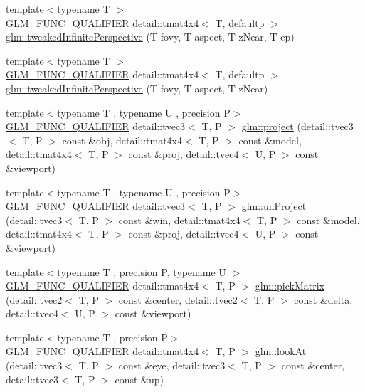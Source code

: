 \begin{DoxyCompactItemize}
\item 
{\footnotesize template$<$typename T $>$ }\\\hyperlink{setup_8hpp_a33fdea6f91c5f834105f7415e2a64407}{G\+L\+M\+\_\+\+F\+U\+N\+C\+\_\+\+Q\+U\+A\+L\+I\+F\+I\+ER} detail\+::tmat4x4$<$ T, defaultp $>$ \hyperlink{group__gtc__matrix__transform_gade8abc58c0ac541163e872eb66f3e5de}{glm\+::tweaked\+Infinite\+Perspective} (T fovy, T aspect, T z\+Near, T ep)
\item 
{\footnotesize template$<$typename T $>$ }\\\hyperlink{setup_8hpp_a33fdea6f91c5f834105f7415e2a64407}{G\+L\+M\+\_\+\+F\+U\+N\+C\+\_\+\+Q\+U\+A\+L\+I\+F\+I\+ER} detail\+::tmat4x4$<$ T, defaultp $>$ \hyperlink{group__gtc__matrix__transform_ga9d67732836d71a79dc21eb8f87603cb7}{glm\+::tweaked\+Infinite\+Perspective} (T fovy, T aspect, T z\+Near)
\item 
{\footnotesize template$<$typename T , typename U , precision P$>$ }\\\hyperlink{setup_8hpp_a33fdea6f91c5f834105f7415e2a64407}{G\+L\+M\+\_\+\+F\+U\+N\+C\+\_\+\+Q\+U\+A\+L\+I\+F\+I\+ER} detail\+::tvec3$<$ T, P $>$ \hyperlink{group__gtc__matrix__transform_ga41227b7b98882dcbaa8dab52df372c7b}{glm\+::project} (detail\+::tvec3$<$ T, P $>$ const \&obj, detail\+::tmat4x4$<$ T, P $>$ const \&model, detail\+::tmat4x4$<$ T, P $>$ const \&proj, detail\+::tvec4$<$ U, P $>$ const \&viewport)
\item 
{\footnotesize template$<$typename T , typename U , precision P$>$ }\\\hyperlink{setup_8hpp_a33fdea6f91c5f834105f7415e2a64407}{G\+L\+M\+\_\+\+F\+U\+N\+C\+\_\+\+Q\+U\+A\+L\+I\+F\+I\+ER} detail\+::tvec3$<$ T, P $>$ \hyperlink{group__gtc__matrix__transform_ga4b0a9086d15e2a743ecd7b6128146af1}{glm\+::un\+Project} (detail\+::tvec3$<$ T, P $>$ const \&win, detail\+::tmat4x4$<$ T, P $>$ const \&model, detail\+::tmat4x4$<$ T, P $>$ const \&proj, detail\+::tvec4$<$ U, P $>$ const \&viewport)
\item 
{\footnotesize template$<$typename T , precision P, typename U $>$ }\\\hyperlink{setup_8hpp_a33fdea6f91c5f834105f7415e2a64407}{G\+L\+M\+\_\+\+F\+U\+N\+C\+\_\+\+Q\+U\+A\+L\+I\+F\+I\+ER} detail\+::tmat4x4$<$ T, P $>$ \hyperlink{group__gtc__matrix__transform_ga0fb64f04bf5ad52523fcd4b10b46aff6}{glm\+::pick\+Matrix} (detail\+::tvec2$<$ T, P $>$ const \&center, detail\+::tvec2$<$ T, P $>$ const \&delta, detail\+::tvec4$<$ U, P $>$ const \&viewport)
\item 
{\footnotesize template$<$typename T , precision P$>$ }\\\hyperlink{setup_8hpp_a33fdea6f91c5f834105f7415e2a64407}{G\+L\+M\+\_\+\+F\+U\+N\+C\+\_\+\+Q\+U\+A\+L\+I\+F\+I\+ER} detail\+::tmat4x4$<$ T, P $>$ \hyperlink{group__gtc__matrix__transform_ga454fdf3163c2779eeeeeb9d75907ce97}{glm\+::look\+At} (detail\+::tvec3$<$ T, P $>$ const \&eye, detail\+::tvec3$<$ T, P $>$ const \&center, detail\+::tvec3$<$ T, P $>$ const \&up)
\end{DoxyCompactItemize}


